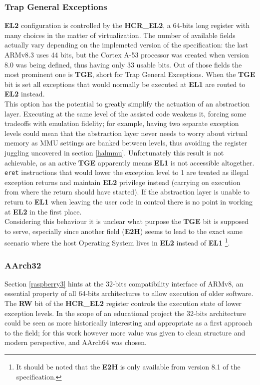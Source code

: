 \documentclass[12pt,a4paper,openright,twoside]{report}
\begin{document}
\subsubsection{Trap General Exceptions}
\textbf{EL2} configuration is controlled by the \textbf{HCR\_EL2}, a 64-bits 
long register with many choices in the matter of virtualization. The number
of available fields actually vary depending on the implemeted version of the
specification: the last ARMv8.3 uses 44 bits, but the Cortex A-53 processor was
created when version 8.0 was being defined, thus having only 33 usable bits.
Out of those fields the most prominent one is \textbf{TGE}, short for Trap General
Exceptions. When the \textbf{TGE} bit is set all exceptions that would normally
be executed at \textbf{EL1} are routed to \textbf{EL2} instead.\\
This option has the potential to greatly simplify the actuation of an abstraction
layer. Executing at the same level of the assisted code weakens it, forcing some
tradeoffs with emulation fidelity; for example, having two separate exception
levels could mean that the abstraction layer never needs to worry about virtual
memory as MMU settings are banked between levels, thus avoiding the register 
juggling uncovered in section \ref{halmmu}.
Unfortunately this result is not achievable, as an active \textbf{TGE} apparently
 means \textbf{EL1} is not accessible altogether. {\tt eret} instructions that
 would lower the exception level to 1 are treated as illegal exception returns 
 and maintain \textbf{EL2} privilege instead (carrying on execution from where
 the return should have started). If the abstraction layer is unable to 
 return to \textbf{EL1} when leaving the user code in control there is no point
 in working at \textbf{EL2} in the first place.\\
 Considering this behaviour it is unclear what purpose the \textbf{TGE} bit
 is supposed to serve, especially since another field (\textbf{E2H}) seems to 
 lead to the exact same scenario where the host Operating System lives in \textbf{EL2}
 instead of \textbf{EL1} \footnote{It should be noted that the \textbf{E2H} is 
 only available from version 8.1 of the specification.}.

\subsubsection{AArch32}
Section \ref{raspberry3} hints at the 32-bits compatibility interface of ARMv8, 
an essential property of all 64-bits architectures to allow execution of older
software. The \textbf{RW} bit of the \textbf{HCR\_EL2} register controls the
execution state of lower exception levels. In the scope of an educational project
the 32-bits architecture could be seen as more historically interesting and
appropriate as a first approach to the field; for this work however more value
was given to clean structure and modern perspective, and AArch64 was chosen.
\end{document}
